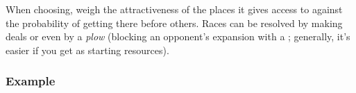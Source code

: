 \documentclass[12pt]{article}
\begin{document}
When choosing, weigh the attractiveness of the places it gives access to against the probability of getting there before others.
Races can be resolved by making deals or even by a \textit{plow} (blocking an opponent's expansion with a ; generally, it's easier if you get  as starting resources).

\vspace{-0.1cm}
\subsubsection{Example}
\end{document}
